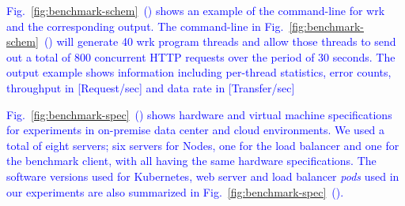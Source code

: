 \textcolor{blue}{
Fig.~\ref{fig:benchmark-schem}~() shows an example of the command-line for wrk and the corresponding output.
The command-line in Fig.~\ref{fig:benchmark-schem}~() will generate 40 wrk program threads
and allow those threads to send out a total of 800 concurrent HTTP requests over the period of 30 seconds.
The output example shows information including per-thread statistics, error counts, throughput in [Request/sec] and data rate in [Transfer/sec]
}

\textcolor{blue}{
Fig.~\ref{fig:benchmark-spec}~() shows hardware and virtual machine specifications for experiments in on-premise data center and cloud environments.
We used a total of eight servers; six servers for Nodes, one for the load balancer and one for the benchmark client, with all having the same hardware specifications.
The software versions used for Kubernetes, web server and load balancer {\em pods} used in our experiments are also summarized in Fig.~\ref{fig:benchmark-spec}~().
}


